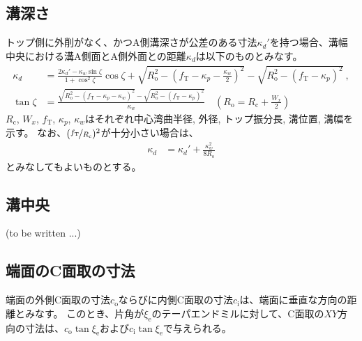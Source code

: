 \subsection{溝深さ}
トップ側に外削がなく、かつA側溝深さが公差のある寸法$\kappa_d'$を持つ場合、溝幅中央における溝A側面とA側外面との距離$\kappa_d$は以下のものとみなす。
\begin{align*}
  \kappa_d
  &= \frac{2\kappa_d'-\kappa_w\sin\zeta}{1+\cos^2\zeta}\cos\zeta
     +\sqrt{R_\mathrm o^2-\left(f_\mathrm T-\kappa_p-\frac{\kappa_w}2\right)^{\!2}}
     -\sqrt{R_\mathrm o^2-\left(f_\mathrm T-\kappa_p\right)^2}\ ,\\
  \tan\zeta
  &= \frac{\sqrt{R_\mathrm o^2-\left(f_\mathrm T-\kappa_p-\kappa_w\right)^2}
           -\sqrt{R_\mathrm o^2-\left(f_\mathrm T-\kappa_p\right)^2}}
          {\kappa_w}\quad
     \left(R_\mathrm o = R_\mathrm c+\frac{W_x}2\right)
\end{align*}
$R_\mathrm c$, $W_x$, $f_\mathrm T$, $\kappa_p$, $\kappa_w$はそれぞれ中心湾曲半径, 外径, トップ振分長, 溝位置, 溝幅を示す。
なお、$(\nicefrac{f_\mathrm T}{R_\mathrm c})^2$が十分小さい場合は、
\begin{align*}
  \kappa_d
  &= \kappa_d'+\frac{\kappa_w^2}{8R_\mathrm o}
\end{align*}
とみなしてもよいものとする。


\subsection{溝中央\TBW}
(to be written ...)



\clearpage


\subsection{端面のC面取の寸法}
端面の外側C面取の寸法$c_\mathrm o$ならびに内側C面取の寸法$c_\mathrm i$は、端面に垂直な方向の距離とみなす。
このとき、片角が$\xi_\mathrm e$のテーパエンドミルに対して、C面取の$XY$方向の寸法は、$c_\mathrm o\tan\xi_\mathrm e$および$c_\mathrm i\tan\xi_\mathrm e$で与えられる。


